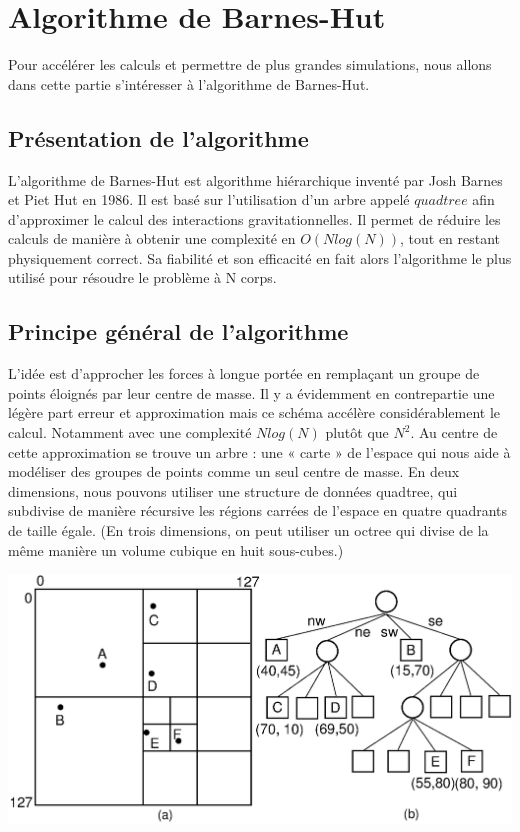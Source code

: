 \chapter{Algorithme de Barnes-Hut}

Pour accélérer les calculs et permettre de plus grandes simulations, nous allons dans cette partie s’intéresser à l’algorithme de Barnes-Hut.

\section{Présentation de l'algorithme}

L'algorithme de Barnes-Hut est algorithme hiérarchique inventé par Josh Barnes et Piet Hut en 1986. Il est basé sur l'utilisation d'un arbre appelé $quadtree$ afin d'approximer le calcul des  interactions gravitationnelles. Il permet de réduire les calculs de manière à obtenir une complexité en $O(Nlog(N))$, tout en restant physiquement correct. Sa fiabilité et son efficacité en fait alors l'algorithme le plus utilisé pour résoudre le problème à N corps.
 
\section{Principe général de l'algorithme}

L'idée est d'approcher les forces à longue portée en remplaçant un groupe de points éloignés par leur centre de masse. Il y a évidemment en contrepartie une légère part erreur et approximation mais ce schéma accélère considérablement le calcul. Notamment avec une complexité $ Nlog(N)$ plutôt que $N^2$.
Au centre de cette approximation se trouve un arbre : une « carte » de l'espace qui nous aide à modéliser des groupes de points comme un seul centre de masse. En deux dimensions, nous pouvons utiliser une structure de données quadtree, qui subdivise de manière récursive les régions carrées de l'espace en quatre quadrants de taille égale. (En trois dimensions, on peut utiliser un octree qui divise de la même manière un volume cubique en huit sous-cubes.)


\begin{center}
\includegraphics[scale=0.2]{./images/quadtree.png}
\captionsetup{hypcap=false}
\label{fig4}
\end{center}

